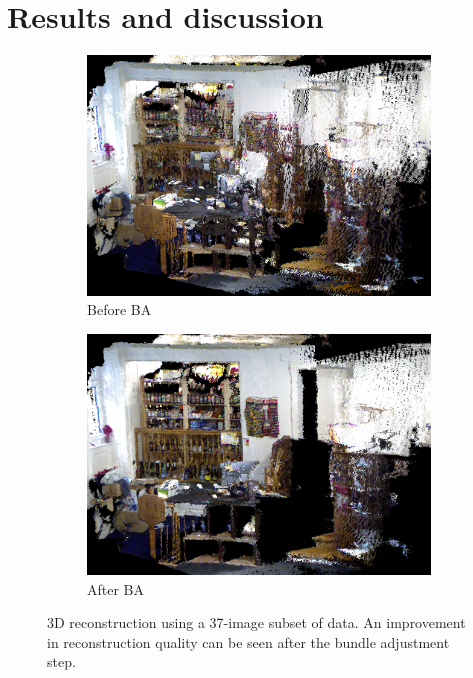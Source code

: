 \documentclass[10pt,twocolumn,letterpaper]{article}
\begin{document}

\section{Results and discussion}\label{sec:result}

\begin{figure}
\centering

   \begin{subfigure}[b]{1.0\columnwidth}
   \includegraphics[width=\textwidth]{figures/result_small_noBA.png}
   \caption{Before BA}
   \label{fig:beforeBA}
   \end{subfigure}
   \hfill
   \begin{subfigure}[b]{1.0\columnwidth}
   \includegraphics[width=\textwidth]{figures/result_small_BA_noD.png}
   \caption{After BA}
   \label{fig:afterBA}
   \end{subfigure}

\caption{3D reconstruction using a 37-image subset of data. An improvement in
reconstruction quality can be seen after the bundle adjustment step.}
\label{fig:3Dsmall}
\end{figure}
\end{document}
